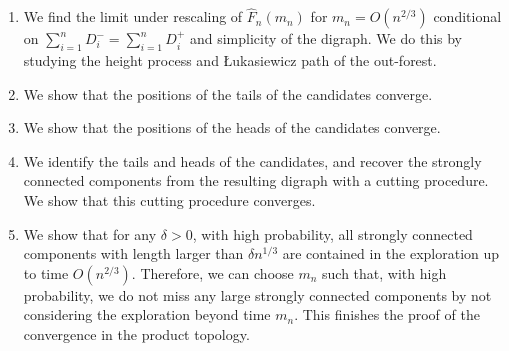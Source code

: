 \begin{enumerate}
    \item We find the limit under rescaling of $\hat{F}_n(m_n)$ for $m_n=O(n^{2/3})$ conditional on $\sum_{i=1}^n D^-_i=\sum_{i=1}^n D^+_i$ and simplicity of the digraph. We do this by studying the height process and \L ukasiewicz path of the out-forest.
    \item We show that the positions of the tails of the candidates converge.
    \item We show that the positions of the heads of the candidates converge.
    \item We identify the tails and heads of the candidates, and recover the strongly connected components from the resulting digraph with a cutting procedure. We show that this cutting procedure converges.
    \item We show that for any $\delta>0$, with high probability, all strongly connected components with length larger than $\delta n^{1/3}$ are contained in the exploration up to time $O(n^{2/3})$. Therefore, we can choose $m_n$ such that, with high probability, we do not miss any large strongly connected components by not considering the exploration beyond time $m_n$. This finishes the proof of the convergence in the product topology.
\end{enumerate}
